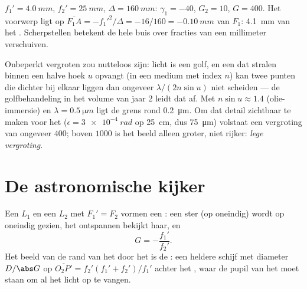 \begin{example}\label{ex:b1:optical-instruments:micronum}
 $f_1' = \qty{4.0}{mm}$,  $f_2' = \qty{25}{mm}$,
$\Delta = \qty{160}{mm}$: $\gamma_1 = -40$, $G_2 = 10$, $G = 400$. Het
voorwerp ligt op $\overline{F_1A} = -f_1'^2/\Delta = -16/160 =
\qty{-0.10}{mm}$ van $F_1$: \qty{4.1}{mm} van het . Scherpstellen
betekent de hele buis over fracties van een millimeter verschuiven.
\end{example}

\begin{remark}\label{rem:b1:optical-instruments:abbe}
Onbeperkt vergroten zou nutteloos zijn: licht is een golf, en een  dat
stralen binnen een halve hoek $u$ opvangt (in een medium met index $n$)
kan twee punten die dichter bij elkaar liggen dan ongeveer
$\lambda/(2n\sin u)$ niet scheiden --- de golfbehandeling in het volume van
jaar 2 leidt dat af. Met $n\sin u \approx 1.4$ (olie-immersie) en $\lambda =
\qty{0.5}{\micro m}$ ligt de grens rond \qty{0.2}{\micro m}. Om dat
detail zichtbaar te maken voor het  ($\epsilon = \qty{3e-4}{rad}$ op
\qty{25}{cm}, dus \qty{75}{\micro m}) volstaat een vergroting van ongeveer $400$;
boven $1000$ is het beeld alleen groter, niet rijker:
\emph{lege vergroting}.
\end{remark}

\section{De astronomische kijker}

\begin{proposition}[Lenzenkijker]\label{prop:b1:optical-instruments:telescope}
Een  $L_1$ en een  $L_2$ met $F_1' = F_2$ vormen een
: een ster (op oneindig) wordt op oneindig gezien, het
ontspannen  bekijkt haar, en
\[
G = -\frac{f_1'}{f_2'} .
\]
Het beeld van de rand van het  door het  is de
\emph{}: een heldere schijf met diameter $D/\abs G$ op
$\overline{O_2P'} = f_2'(f_1' + f_2')/f_1'$ achter het , waar de
pupil van het  moet staan om al het licht op te vangen.
\end{proposition}

